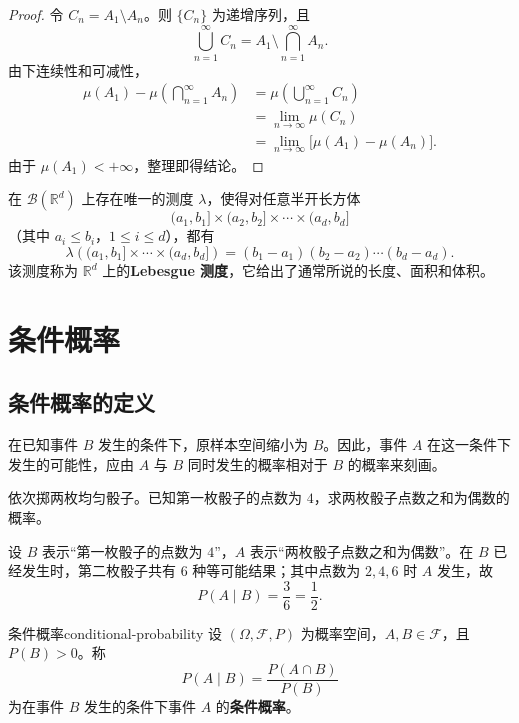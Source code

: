 \begin{proof}
令 $C_n=A_1\setminus A_n$。则 $\{C_n\}$ 为递增序列，且
\[
\bigcup_{n=1}^{\infty}C_n
=A_1\setminus\bigcap_{n=1}^{\infty}A_n.
\]
由下连续性和可减性，
\[
\begin{aligned}
\mu(A_1)-\mu\left(\bigcap_{n=1}^{\infty}A_n\right)
&=\mu\left(\bigcup_{n=1}^{\infty}C_n\right)\\
&=\lim_{n\to\infty}\mu(C_n)\\
&=\lim_{n\to\infty}\bigl[\mu(A_1)-\mu(A_n)\bigr].
\end{aligned}
\]
由于 $\mu(A_1)<+\infty$，整理即得结论。
\end{proof}

\begin{example}[Lebesgue 测度]
在 $\mathscr{B}(\mathbb{R}^d)$ 上存在唯一的测度 $\lambda$，使得对任意半开长方体
\[
(a_1,b_1]\times(a_2,b_2]\times\cdots\times(a_d,b_d]
\]
（其中 $a_i\leq b_i$，$1\leq i\leq d$），都有
\[
\lambda\left((a_1,b_1]\times\cdots\times(a_d,b_d]\right)
=(b_1-a_1)(b_2-a_2)\cdots(b_d-a_d).
\]
该测度称为 $\mathbb{R}^d$ 上的\textbf{Lebesgue 测度}，它给出了通常所说的长度、面积和体积。
\end{example}

\section{条件概率}

\subsection*{条件概率的定义}

在已知事件 $B$ 发生的条件下，原样本空间缩小为 $B$。因此，事件 $A$ 在这一条件下发生的可能性，应由 $A$ 与 $B$ 同时发生的概率相对于 $B$ 的概率来刻画。

\begin{example}[掷两枚骰子]
依次掷两枚均匀骰子。已知第一枚骰子的点数为 $4$，求两枚骰子点数之和为偶数的概率。

设 $B$ 表示“第一枚骰子的点数为 $4$”，$A$ 表示“两枚骰子点数之和为偶数”。在 $B$ 已经发生时，第二枚骰子共有 $6$ 种等可能结果；其中点数为 $2,4,6$ 时 $A$ 发生，故
\[
P(A\mid B)=\frac{3}{6}=\frac12.
\]
\end{example}

\begin{mydefinition}{条件概率}{conditional-probability}
设 $(\Omega,\mathscr{F},P)$ 为概率空间，$A,B\in\mathscr{F}$，且 $P(B)>0$。称
\[
P(A\mid B)=\frac{P(A\cap B)}{P(B)}
\]
为在事件 $B$ 发生的条件下事件 $A$ 的\textbf{条件概率}。
\end{mydefinition}

